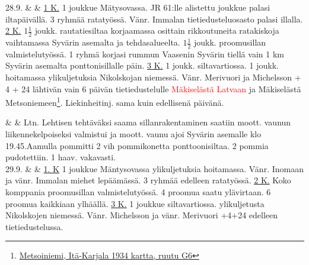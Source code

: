 \documentclass[11pt,a5paper,oneside]{book}
\begin{document}
\newpage

28.9. & & \underline{1 K.} 1 joukkue Mätysovassa. JR 61:lle alistettu joukkue palasi iltapäivällä. 3 ryhmää ratatyössä. Vänr. Immalan tietiedusteluosasto palasi illalla. \newline\newline \underline{2 K.} $1\frac{1}{2}$ joukk. rautatiesiltaa korjaamassa osittain rikkoutuneita ratakiskoja vaihtamassa Syvärin asemalta ja tehdasalueelta. $1\frac{1}{2}$ joukk. proomusillan valmistelutyössä. 1 ryhmä korjasi rummun Vaasenin Syvärin tiellä vain 1 km Syvärin asemalta ponttonisillalle päin. \newline\newline \underline{3 K.} 1 joukk. siltavartiossa. 1 joukk. hoitamassa ylikuljetuksia Nikolskojan niemessä. Vänr. Merivuori ja Michelsson + 4 + 24 lähtivän vain 6 päivän tietiedustelulle \textcolor{red}{Mäkiselästä} \textcolor{red}{Latvaan} ja Mäkiselästä Metsoniemeen\footnote{\href{https://www.google.fi/maps/place/61\%C2\%B008'13.7\%22N+33\%C2\%B050'07.6\%22E/@61.1371306,33.8332443,1153m/}{Metsoiniemi, Itä-Karjala 1934 kartta, ruutu G6}}. \newline Liekinheitinj. sama kuin edellisenä päivänä. \\

\taulustop


& & Ltn. Lehtisen tehtäväksi saama sillanrakentaminen saatiin moott. vaunun liikennekelpoiseksi valmistui ja moott. vaunu ajoi Syvärin asemalle klo 19.45.\newline Aamulla pommitti 2 vih pommikonetta ponttoonisiltaa. 2 pommia pudotettiin. 1 haav. vakavasti. \newline\newline \\

29.9. &  & \underline{1. K} 1 joukkue Mäntysovassa ylikuljetuksia hoitamassa. Vänr. Inomaan ja vänr. Immalan miehet lepäämässä. 3 ryhmää edelleen ratatyössä. \newline\newline \underline{2 K.} Koko komppania proomusillan valmistelutyössä. 4 proomua saatu ylävirtaan. 6 proomua kaikkiaan ylhäällä. \newline \underline{3 K.} 1 joukkue siltavartiossa. ylikuljetusta Nikolskojen niemessä. Vänr. Michelsson ja vänr. Merivuori +4+24 edelleen tietiedustelussa. \\
\end{document}
